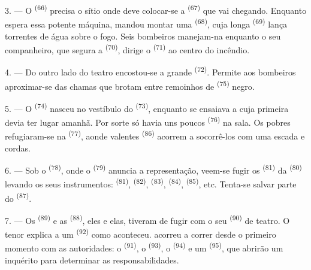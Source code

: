 3. --- O  \textsuperscript{(66)} precisa o sítio onde deve
colocar-se a  \textsuperscript{(67)} que vai chegando.
Enquanto espera essa potente máquina, mandou montar uma  \textsuperscript{(68)}, cuja longa  \textsuperscript{(69)} lança
torrentes de água sobre o fogo. Seis bombeiros manejam-na enquanto o seu
companheiro, que segura a  \textsuperscript{(70)}, dirige o
 \textsuperscript{(71)} ao centro do incêndio.

4. --- Do outro lado do teatro encostou-se a grande 
\textsuperscript{(72)}. Permite aos bombeiros aproximar-se das chamas que brotam
entre remoinhos de  \textsuperscript{(75)} negro.

\VUsaut{5.0mm}
\VUsaut{3.4mm}

5. --- O  \textsuperscript{(74)} nasceu no vestíbulo do
 \textsuperscript{(73)}, enquanto se ensaiava a  cuja
primeira  devia ter lugar amanhã. Por sorte só havia
uns poucos  \textsuperscript{(76)} na sala. Os pobres
refugiaram-se na  \textsuperscript{(77)}, aonde valentes
 \textsuperscript{(86)} acorrem a socorrê-los com uma escada e
cordas.

6. --- Sob o  \textsuperscript{(78)}, onde o 
\textsuperscript{(79)} anuncia a representação, veem-se fugir os 
\textsuperscript{(81)} da  \textsuperscript{(80)} levando os seus
instrumentos:  \textsuperscript{(81)}, 
\textsuperscript{(82)},  \textsuperscript{(83)}, 
\textsuperscript{(84)},  \textsuperscript{(85)}, etc. Tenta-se salvar parte
do  \textsuperscript{(87)}.

7. --- Os  \textsuperscript{(89)} e as 
\textsuperscript{(88)},  eles e elas, tiveram de fugir com o seu
 \textsuperscript{(90)} de teatro. O tenor explica a um
 \textsuperscript{(92)} como aconteceu. 
acorreu a correr desde o primeiro momento com as autoridades: o
 \textsuperscript{(91)}, o 
\textsuperscript{(93)}, o  \textsuperscript{(94)} e um
 \textsuperscript{(95)}, que abrirão um inquérito para determinar as
responsabilidades.
\VUsaut{6.0mm}
\VUfilet{22mm}
